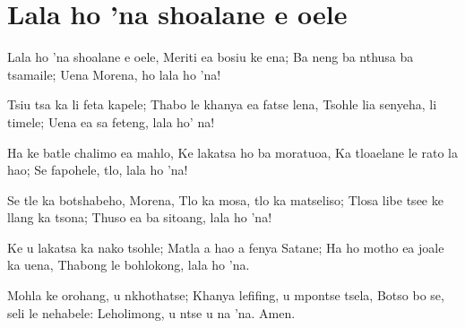 \starttocol
\chapter{Lala ho 'na shoalane e oele}
\nexttocol
\hfill{\it }
\stoptocol
\starttocol
\startlines
{\sc Lala} ho 'na shoalane e oele,
Meriti ea bosiu ke ena;
Ba neng ba nthusa ba tsamaile;
Uena Morena, ho lala ho 'na!

Tsiu tsa ka li feta kapele;
Thabo le khanya ea fatse lena,
Tsohle lia senyeha, li  timele;
Uena ea sa feteng, lala ho' na!

Ha ke batle chalimo ea mahlo,
Ke lakatsa ho ba moratuoa,
Ka tloaelane le rato la hao;
Se fapohele, tlo, lala ho 'na!

Se tle ka botshabeho, Morena,
Tlo ka mosa, tlo ka matseliso;
Tlosa libe tsee ke llang ka tsona;
Thuso ea ba sitoang, lala ho 'na!

 Ke u lakatsa ka nako tsohle;
Matla a hao a fenya Satane; 
Ha ho motho ea joale ka uena,
Thabong le bohlokong, lala ho 'na.

Mohla ke orohang, u nkhothatse;
Khanya lefifing, u mpontse tsela,
Botso bo se, seli le nehabele:
Leholimong, u ntse u na 'na.
      \hfill Amen.~~~~~~~~~
\stoplines
\nexttocol

\stoptocol
